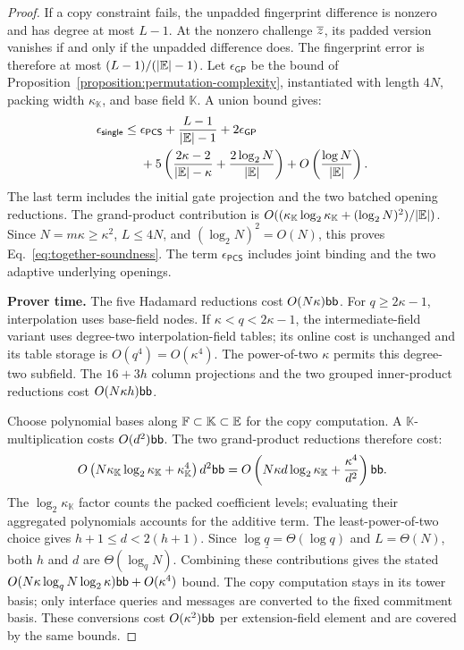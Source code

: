 \begin{proof}
If a copy constraint fails, the unpadded fingerprint difference
is nonzero and has degree at most \(L-1\).
At the nonzero challenge \(\overline{z}\), its padded version vanishes
if and only if the unpadded difference does.
The fingerprint error is therefore at most
\((L-1)/(|\mathbb{E}|-1)\).
Let \(\epsilon_{\mathsf{GP}}\) be the bound of
Proposition~\ref{proposition:permutation-complexity},
instantiated with length \(4N\), packing width
\(\kappa_{\mathbb K}\), and base field \(\mathbb K\).
A union bound gives:
\[
\begin{aligned}
    \epsilon_{\mathsf{single}}\leq{}&
    \epsilon_{\mathsf{PCS}}
    +\frac{L-1}{|\mathbb{E}|-1}
    +2\epsilon_{\mathsf{GP}}\\
    &+5\left(
        \frac{2\kappa-2}{|\mathbb{E}|-\kappa}
        +\frac{2\log_2N}{|\mathbb{E}|}
      \right)
    +O\left(\frac{\log N}{|\mathbb{E}|}\right).
\end{aligned}
\]
The last term includes the initial gate projection and the
two batched opening reductions.
The grand-product contribution is
\(O((\kappa_{\mathbb K}\log_2\kappa_{\mathbb K}
+(\log_2N)^2)/|\mathbb{E}|)\).
Since \(N=m\kappa\geq\kappa^2\), \(L\leq4N\), and
\((\log_2N)^2=O(N)\), this proves
Eq.~\eqref{eq:together-soundness}.
The term \(\epsilon_{\mathsf{PCS}}\) includes joint binding
and the two adaptive underlying openings.

\smallskip\noindent\textbf{Prover time.}
The five Hadamard reductions cost \(O(N\kappa)\mathsf{bb}\).
For \(q\geq2\kappa-1\), interpolation uses base-field nodes.
If \(\kappa<q<2\kappa-1\), the intermediate-field variant
uses degree-two interpolation-field tables; its online cost
is unchanged and its table storage is \(O(q^4)=O(\kappa^4)\).
The power-of-two \(\kappa\) permits this degree-two subfield.
The \(16+3h\) column projections and the two grouped
inner-product reductions cost \(O(N\kappa h)\mathsf{bb}\).

Choose polynomial bases along \({\mathbb{F}}\subset\mathbb K
\subset\mathbb{E}\) for the copy computation.
A \(\mathbb K\)-multiplication costs \(O(d^2)\mathsf{bb}\).
The two grand-product reductions therefore cost:
\[
    O\left(
       N\kappa_{\mathbb K}\log_2\kappa_{\mathbb K}
       +\kappa_{\mathbb K}^4
    \right)d^2\mathsf{bb}
    =
    O\left(
       N\kappa d\log_2\kappa_{\mathbb K}
       +\frac{\kappa^4}{d^2}
    \right)\mathsf{bb}.
\]
The \(\log_2\kappa_{\mathbb K}\) factor counts the packed
coefficient levels; evaluating their aggregated polynomials
accounts for the additive term.
The least-power-of-two choice gives
\(h+1\leq d<2(h+1)\).
Since \(\log\underline q=\Theta(\log q)\) and \(L=\Theta(N)\),
both \(h\) and \(d\) are \(\Theta(\log_qN)\).
Combining these contributions gives the stated
\(O(N\kappa\log_qN\log_2\kappa)\mathsf{bb}+O(\kappa^4)\) bound.
The copy computation stays in its tower basis; only interface
queries and messages are converted to the fixed commitment basis.
These conversions cost \(O(\kappa^2)\mathsf{bb}\) per extension-field
element and are covered by the same bounds.


\end{proof}
